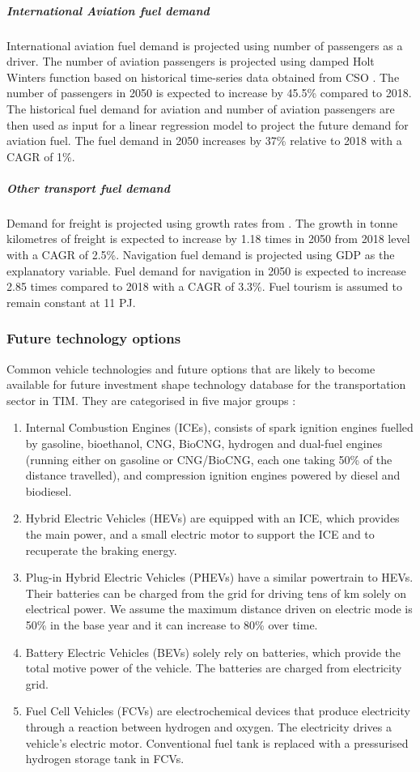 \documentclass[gmd,manuscript]{copernicus}
\begin{document}
\subparagraph{International Aviation fuel demand}
International aviation fuel demand is projected using number of passengers as a driver. The number of aviation passengers is projected using damped Holt Winters function based on historical time-series data obtained from CSO \citep{Dantas2017,Grubb2001}. The number of passengers in 2050 is expected to increase by 45.5\% compared to 2018. The historical fuel demand for aviation and number of aviation passengers are then used as input for a linear regression model to project the future demand for aviation fuel. The fuel demand in 2050 increases by 37\% relative to 2018 with a CAGR of 1\%. 

\subparagraph{Other transport fuel demand}
Demand for freight is projected using growth rates from \citet {AECOMIrelandLimited2019}. The growth in tonne kilometres of freight is expected to increase by 1.18 times in 2050 from 2018 level with a CAGR of 2.5\%. Navigation fuel demand is projected using GDP as the explanatory variable. Fuel demand for navigation in 2050 is expected to increase 2.85 times compared to 2018 with a CAGR of 3.3\%. Fuel tourism is assumed to remain constant at 11 PJ. 

\subsubsection{Future technology options}

Common vehicle technologies and future options that are likely to become available for future investment shape technology database for the transportation sector in TIM. They are categorised in five major groups \citep{Aryanpur2015}:

\begin{enumerate}
 \item Internal Combustion Engines (ICEs), consists of spark ignition engines fuelled by gasoline, bioethanol, CNG, BioCNG, hydrogen and dual-fuel engines (running either on gasoline or CNG/BioCNG, each one taking 50\% of the distance travelled), and compression ignition engines powered by diesel and biodiesel. 
\item Hybrid Electric Vehicles (HEVs) are equipped with an ICE, which provides the main power, and a small electric motor to support the ICE and to recuperate the braking energy. 
\item Plug-in Hybrid Electric Vehicles (PHEVs) have a similar powertrain to HEVs. Their batteries can be charged from the grid for driving tens of km solely on electrical power. We assume the maximum distance driven on electric mode is 50\% in the base year and it can increase to 80\% over time. 
\item Battery Electric Vehicles (BEVs) solely rely on batteries, which provide the total motive power of the vehicle. The batteries are charged from electricity grid. 
\item Fuel Cell Vehicles (FCVs) are electrochemical devices that produce electricity through a reaction between hydrogen and oxygen. The electricity drives a vehicle’s electric motor. Conventional fuel tank is replaced with a pressurised hydrogen storage tank in FCVs. 
\end{enumerate}
\end{document}
